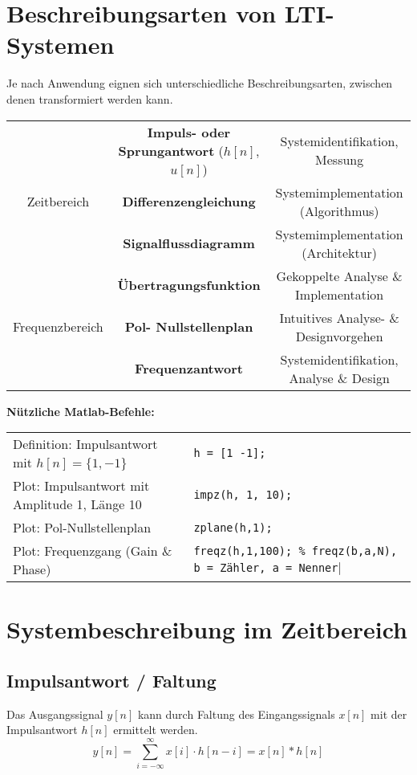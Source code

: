 \section{Beschreibungsarten von LTI-Systemen}
Je nach Anwendung eignen sich unterschiedliche Beschreibungsarten, zwischen denen 
transformiert werden kann. 
\begin{table}[H]
\centering
\begin{tabular}{ccc}\hline
\multicolumn{1}{l}{} & \textbf{Impuls- oder Sprungantwort} ($h[n]$, $u[n]$) & Systemidentifikation, Messung \\
Zeitbereich & \textbf{Differenzengleichung} & Systemimplementation (Algorithmus) \\
 & \textbf{Signalflussdiagramm} & Systemimplementation (Architektur) \\ \hline
 & \textbf{Übertragungsfunktion} & Gekoppelte Analyse \& Implementation \\
Frequenzbereich & \textbf{Pol- Nullstellenplan} & Intuitives Analyse- \& Designvorgehen \\
\multicolumn{1}{l}{} & \textbf{Frequenzantwort} & Systemidentifikation, Analyse \& Design \\\hline 
\end{tabular}\vspace{-3mm}
\end{table}
\noindent \textbf{Nützliche Matlab-Befehle:}\\
\begin{tabular}{ll}
Definition: Impulsantwort mit $h[n] = \{1, -1\}$ & \verb|h = [1 -1];| \\
Plot: Impulsantwort mit Amplitude 1, Länge 10 & \verb|impz(h, 1, 10);| \\
Plot: Pol-Nullstellenplan & \verb|zplane(h,1);| \\
Plot: Frequenzgang (Gain \& Phase) & \verb|freqz(h,1,100); % freqz(b,a,N), b = Zähler, a = Nenner|
\end{tabular}\vspace{-3mm}

\section{Systembeschreibung im Zeitbereich}
\subsection{Impulsantwort / Faltung}
Das Ausgangssignal $y[n]$ kann durch Faltung des Eingangssignals $x[n]$ mit der Impulsantwort $h[n]$
ermittelt werden. 
\[ y[n] = \sum_{i=-\infty}^{\infty} x[i] \cdot h[n-i] = x[n] * h[n] \]
